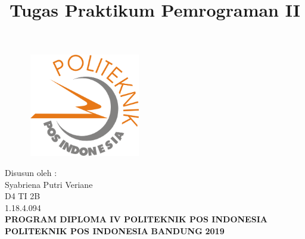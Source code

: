 \documentclass[a4paper, 12pt]{article}
\begin{document}
\title{\huge\textbf{Tugas Praktikum Pemrograman II}}
\date{}

\maketitle


\begin{figure}[!ht]
\begin{center}
\includegraphics[width = 5cm, height = 4.5cm]{gambar/logo.png}
\end{center}
\end{figure}

\begin{center}
\vspace{1cm}
Disusun oleh :\\
Syabriena Putri Veriane\\
D4 TI 2B\\
1.18.4.094\\
\vspace{1cm}
\textbf{PROGRAM DIPLOMA IV POLITEKNIK POS INDONESIA} \linebreak
\textbf{POLITEKNIK POS INDONESIA} \linebreak
\textbf{BANDUNG}\linebreak
\textbf{2019}

\end{center}

\thispagestyle{empty}


\end{document}
